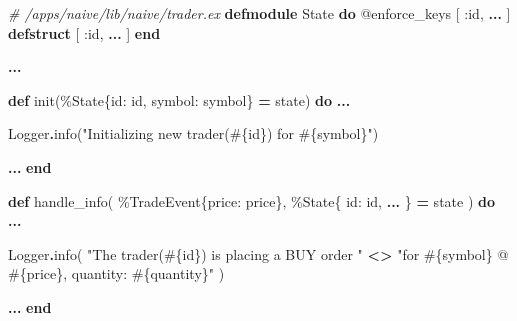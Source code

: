 \documentclass[
  oneside]{book}
\newenvironment{Shaded}{\begin{snugshade}}{\end{snugshade}}
\newcommand{\CommentTok}[1]{\textcolor[rgb]{0.56,0.35,0.01}{\textit{#1}}}
\newcommand{\ConstantTok}[1]{\textcolor[rgb]{0.00,0.00,0.00}{#1}}
\newcommand{\KeywordTok}[1]{\textcolor[rgb]{0.13,0.29,0.53}{\textbf{#1}}}
\newcommand{\NormalTok}[1]{#1}
\newcommand{\OperatorTok}[1]{\textcolor[rgb]{0.81,0.36,0.00}{\textbf{#1}}}
\newcommand{\OtherTok}[1]{\textcolor[rgb]{0.56,0.35,0.01}{#1}}
\newcommand{\StringTok}[1]{\textcolor[rgb]{0.31,0.60,0.02}{#1}}
\newcommand{\VariableTok}[1]{\textcolor[rgb]{0.00,0.00,0.00}{#1}}
\begin{document}
\begin{Shaded}
\begin{Highlighting}[]
  \CommentTok{\# /apps/naive/lib/naive/trader.ex}
  \KeywordTok{defmodule} \ConstantTok{State} \KeywordTok{do}
    \OtherTok{@enforce\_keys}\NormalTok{ [}
      \VariableTok{:id}\NormalTok{,}
      \OperatorTok{...}
\NormalTok{    ]}
    \KeywordTok{defstruct}\NormalTok{ [}
      \VariableTok{:id}\NormalTok{,}
      \OperatorTok{...}
\NormalTok{    ]}
  \KeywordTok{end}

  \OperatorTok{...}

  \KeywordTok{def}\NormalTok{ init(\%}\ConstantTok{State}\NormalTok{\{}\VariableTok{id:}\NormalTok{ id, }\VariableTok{symbol:}\NormalTok{ symbol\} }\OperatorTok{=}\NormalTok{ state) }\KeywordTok{do}
    \OperatorTok{...}

    \ConstantTok{Logger}\OperatorTok{.}\NormalTok{info(}\StringTok{"Initializing new trader(}\OtherTok{\#\{}\NormalTok{id}\OtherTok{\}}\StringTok{) for }\OtherTok{\#\{}\NormalTok{symbol}\OtherTok{\}}\StringTok{"}\NormalTok{)}

    \OperatorTok{...}
  \KeywordTok{end}

  \KeywordTok{def}\NormalTok{ handle\_info(}
\NormalTok{        \%}\ConstantTok{TradeEvent}\NormalTok{\{}\VariableTok{price:}\NormalTok{ price\},}
\NormalTok{        \%}\ConstantTok{State}\NormalTok{\{}
          \VariableTok{id:}\NormalTok{ id,}
          \OperatorTok{...}
\NormalTok{        \} }\OperatorTok{=}\NormalTok{ state}
\NormalTok{      ) }\KeywordTok{do}
    \OperatorTok{...}

    \ConstantTok{Logger}\OperatorTok{.}\NormalTok{info(}
      \StringTok{"The trader(}\OtherTok{\#\{}\NormalTok{id}\OtherTok{\}}\StringTok{) is placing a BUY order "} \OperatorTok{\textless{}\textgreater{}}
        \StringTok{"for }\OtherTok{\#\{}\NormalTok{symbol}\OtherTok{\}}\StringTok{ @ }\OtherTok{\#\{}\NormalTok{price}\OtherTok{\}}\StringTok{, quantity: }\OtherTok{\#\{}\NormalTok{quantity}\OtherTok{\}}\StringTok{"}
\NormalTok{    )}

    \OperatorTok{...}
  \KeywordTok{end}


\end{Highlighting}
\end{Shaded}
\end{document}
